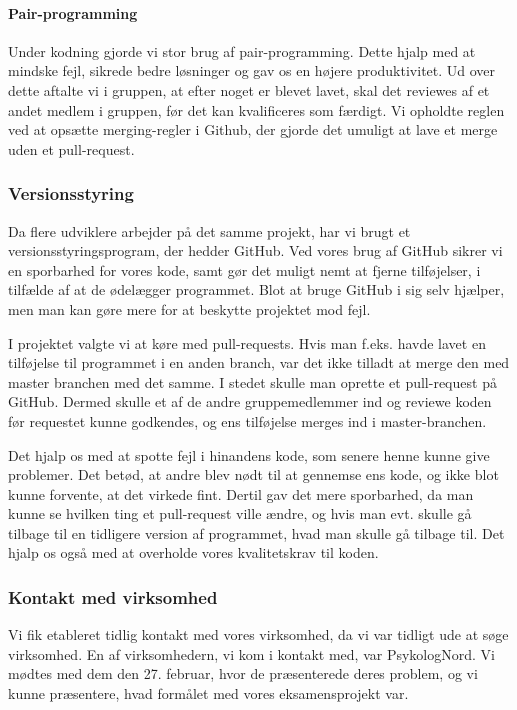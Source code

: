 \paragraph*{Pair-programming}
Under kodning gjorde vi stor brug af pair-programming.
Dette hjalp med at mindske fejl, sikrede bedre løsninger og gav os en højere produktivitet.
Ud over dette aftalte vi i gruppen, at efter noget er blevet lavet, skal det reviewes af et andet medlem i gruppen, før det kan kvalificeres som færdigt.
Vi opholdte reglen ved at opsætte merging-regler i Github, der gjorde det umuligt at lave et merge uden et pull-request.

\subsubsection{Versionsstyring}
\label{versionsstyring}

Da flere udviklere arbejder på det samme projekt, har vi brugt et versionsstyringsprogram, der hedder GitHub.
Ved vores brug af GitHub sikrer vi en sporbarhed for vores kode, samt gør det muligt nemt at fjerne tilføjelser, i tilfælde af at de ødelægger programmet.
Blot at bruge GitHub i sig selv hjælper, men man kan gøre mere for at beskytte projektet mod fejl.

I projektet valgte vi at køre med pull-requests. 
Hvis man f.eks. havde lavet en tilføjelse til programmet i en anden branch, var det ikke tilladt at merge den med master branchen med det samme. 
I stedet skulle man oprette et pull-request på GitHub. 
Dermed skulle et af de andre gruppemedlemmer ind og reviewe koden før requestet kunne godkendes, og ens tilføjelse merges ind i master-branchen.

Det hjalp os med at spotte fejl i hinandens kode, som senere henne kunne give problemer.
Det betød, at andre blev nødt til at gennemse ens kode, og ikke blot kunne forvente, at det virkede fint.
Dertil gav det mere sporbarhed, da man kunne se hvilken ting et pull-request ville ændre, og hvis man evt. skulle gå tilbage til en tidligere version af programmet, hvad man skulle gå tilbage til.
Det hjalp os også med at overholde vores kvalitetskrav til koden. 

\subsubsection{Kontakt med virksomhed}

Vi fik etableret tidlig kontakt med vores virksomhed, da vi var tidligt ude at søge virksomhed.
En af virksomhedern, vi kom i kontakt med, var PsykologNord.
Vi mødtes med dem den 27. februar, hvor de præsenterede deres problem, og vi kunne præsentere, hvad formålet med vores eksamensprojekt var.

